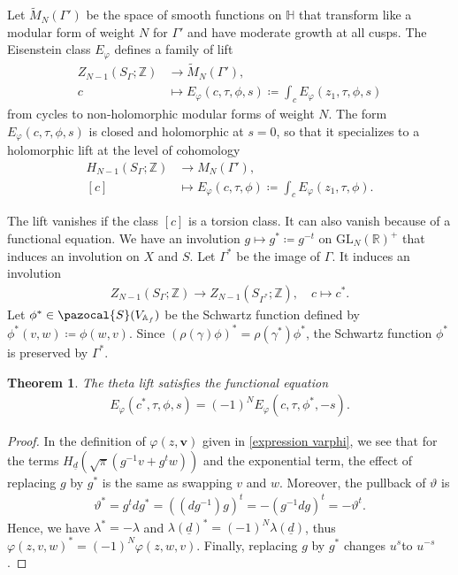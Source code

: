 \documentclass[twoside,a4paper,10pt]{article} %
\newcommand{\Mtil}{\widetilde{M}}
\newcommand{\uud}{\underline{d}}
\newcommand{\8}{\infty}
\newcommand{\Z}{\mathbb{Z}}
\newcommand{\vbf}{\mathbf{v}}
\newcommand{\GL}{\mathrm{GL}}
\newcommand{\HH}{\mathbb{H}}
\newcommand{\R}{\mathbb{R}}
\newcommand{\A}{\mathbb{A}}
\newcommand{\Scal}{\pazocal{S}}
\theoremstyle{mytheoremstyle}
\newtheorem{thm}{Theorem}[section]
\theoremstyle{remark}
\numberwithin{equation}{section}
\begin{document}
Let $\Mtil_{N}(\Gamma')$ be the space of smooth functions on $\HH$ that transform like a modular form of weight $N$ for $\Gamma'$ and have moderate growth at all cusps. The Eisenstein class $E_\varphi$ defines a family of lift
\begin{align}
Z_{N-1}(S_\Gamma;\Z) & \longrightarrow \Mtil_{N}(\Gamma'), \\
 c & \longmapsto E_\varphi(c,\tau,\phi,s) \coloneqq \int_c E_\varphi(z_1,\tau,\phi,s)
\end{align}
from cycles to non-holomorphic modular forms of weight $N$. The form $E_\varphi(c,\tau,\phi,s)$ is closed and holomorphic at $s=0$, so that it specializes to a holomorphic lift at the level of cohomology
\begin{align} \label{theta lift at zero}
H_{N-1}(S_\Gamma;\Z) & \longrightarrow M_{N}(\Gamma'),\\
 [c] & \longmapsto E_\varphi(c,\tau,\phi) \coloneqq \int_c E_\varphi(z_1,\tau,\phi).
\end{align}

The lift vanishes if the class $[c]$ is a torsion class. It can also vanish because of a functional equation. We have an involution $g \longmapsto g^\ast \coloneqq g^{-t}$ on $\GL_N(\R)^+$ that induces an involution on $X$ and $S$. Let $\Gamma^\ast$ be the image of $\Gamma$. It induces an involution
\begin{align}
Z_{N-1}(S_\Gamma;\Z) \longrightarrow Z_{N-1}(S_{\Gamma^\ast};\Z), \quad c \longmapsto c^\ast.
\end{align}
Let $\phi^\ast \in \Scal(V_{\A_f})$ be the Schwartz function defined by $\phi^\ast(v,w) \coloneqq \phi(w,v)$. Since $(\rho(\gamma)\phi)^\ast=\rho(\gamma^\ast)\phi^\ast$, the Schwartz function $\phi^\ast$  is preserved by $\Gamma^\ast$.
\begin{thm} \label{functional equation lift}The theta lift satisfies the functional equation
\begin{align}
E_\varphi(c^\ast,\tau,\phi,s)=(-1)^NE_\varphi(c,\tau,\phi^\ast,-s).
\end{align}
\end{thm}
\begin{proof} In the definition of $\varphi(z,\vbf)$ given in \eqref{expression varphi}, we see that for the terms $H_{\uud}(\sqrt{\pi}(g^{-1}v+g^t w))$ and the exponential term, the effect of replacing $g$ by $g^\ast$ is the same as swapping $v$ and $w$. Moreover, the pullback of $\vartheta$ is
\begin{align}
\vartheta^\ast=g^tdg^\ast=((dg^{-1})g)^t=-(g^{-1}dg)^t=-\vartheta^t.
\end{align}
Hence, we have $\lambda^\ast=-\lambda$ and $\lambda(\uud)^\ast=(-1)^N\lambda(\uud)$, thus $\varphi(z,v,w)^\ast=(-1)^N\varphi(z,w,v)$. Finally, replacing $g$ by $g^\ast$ changes $u^s$to $u^{-s}$.
\end{proof}
\end{document}
